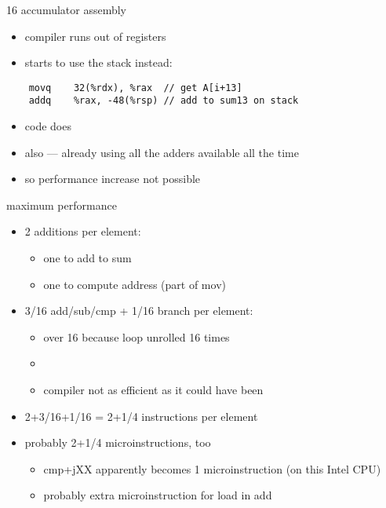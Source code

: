 \begin{frame}[fragile,label=16accAsm]{16 accumulator assembly}
    \begin{itemize}
    \item compiler runs out of registers
    \item starts to use the stack instead:
    \end{itemize}
\begin{lstlisting}
    movq    32(%rdx), %rax  // get A[i+13]
    addq    %rax, -48(%rsp) // add to sum13 on stack
\end{lstlisting}
    \begin{itemize}
        \item code does 
        \item also --- already using all the adders available all the time
        \item so performance increase not possible
    \end{itemize}
\end{frame}


\begin{frame}{maximum performance}
    \begin{itemize}
    \item 2 additions per element:
        \begin{itemize}
        \item one to add to sum
        \item one to compute address (part of mov)
        \end{itemize}
    \item 3/16 add/sub/cmp + 1/16 branch per element:
        \begin{itemize}
        \item over 16 because loop unrolled 16 times
        \item {}
        \item compiler not as efficient as it could have been
        \end{itemize}
    \item 2+3/16+1/16 = 2+1/4 instructions per element
    \item probably 2+1/4 microinstructions, too
        \begin{itemize}
        \item cmp+jXX apparently becomes 1 microinstruction (on this Intel CPU)
        \item probably extra microinstruction for load in add
        \end{itemize}
    \end{itemize}
\end{frame}

